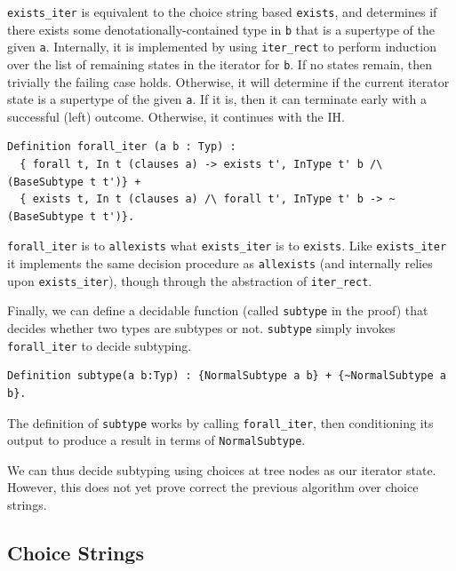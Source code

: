 \documentclass[a4paper,english]{lipics-v2019}
\begin{document}
\verb|exists_iter| is equivalent to the choice string based \verb|exists|,
and determines if there exists some denotationally-contained type in \verb|b|
that is a supertype of the given \verb|a|. Internally, it is implemented by 
using \verb|iter_rect| to perform induction over the list of remaining states in
the iterator for \verb|b|. If no states remain, then trivially the failing case holds.
Otherwise, it will determine if the current iterator state is a supertype of the given
\verb|a|. If it is, then it can terminate early with a successful (left) outcome. Otherwise,
it continues with the IH.

\begin{small}\begin{verbatim}
Definition forall_iter (a b : Typ) :
  { forall t, In t (clauses a) -> exists t', InType t' b /\ (BaseSubtype t t')} +
  { exists t, In t (clauses a) /\ forall t', InType t' b -> ~ (BaseSubtype t t')}.
\end{verbatim}\end{small}

\verb|forall_iter| is to \verb|allexists| what \verb|exists_iter| is to
\verb|exists|. Like \verb|exists_iter| it implements the same decision procedure
as \verb|allexists| (and internally relies upon \verb|exists_iter|), though through
the abstraction of \verb|iter_rect|.

Finally, we can define a decidable function (called \verb|subtype| in the proof)
that decides whether two types are subtypes or not. \verb|subtype| simply invokes
\verb|forall_iter| to decide subtyping.

\begin{small}\begin{verbatim}
Definition subtype(a b:Typ) : {NormalSubtype a b} + {~NormalSubtype a b}.
\end{verbatim}\end{small}

\noindent The definition of \verb|subtype| works by calling \verb|forall_iter|, then
conditioning its output to produce a result in terms of \verb|NormalSubtype|. 

We can thus decide subtyping using choices at tree nodes as our iterator state.
However, this does not yet prove correct the previous algorithm over choice strings.

\subsection{Choice Strings}
\end{document}
